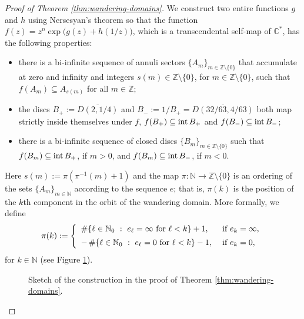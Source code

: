 \documentclass[a4paper, 12pt, reqno]{amsart}
\numberwithin{equation}{section}
\newcommand{\ds}{\displaystyle}
\theoremstyle{plain}
\theoremstyle{definition}
\theoremstyle{remark}
\newcommand{\C}{{\mathbb{C}}}
\newcommand{\Z}{{\mathbb{Z}}}
\newcommand{\N}{{\mathbb{N}}}
\begin{document}
\begin{proof}[Proof of Theorem \ref{thm:wandering-domains}] 
We construct two entire functions $g$ and $h$ using Nersesyan's theorem so that the function $f(z)=z^n\exp\bigl(g(z)+h(1/z)\bigr)$, which is a transcendental self-map of $\C^*$, has the following properties:
\begin{itemize}
\item there is a bi-infinite sequence of annuli sectors $\{A_m\}_{m\in\Z\setminus\{0\}}$ that accumulate at zero and infinity and integers $s(m)\in\Z\setminus\{0\}$, for $m\in\Z\setminus\{0\}$, such that $f(A_m)\subseteq A_{s(m)}$ for all $m\in\Z$;
\item the discs $B_+:=\overline{D(2,1/4)}$ and $B_-:=1/B_+=\overline{D(32/63, 4/63)}$ both map strictly inside themselves under $f$, $f(B_+)\subseteq \textup{int}\,B_+$ and $f(B_-)\subseteq \textup{int}\,B_-$;
\item there is a bi-infinite sequence of closed discs $\{B_m\}_{m\in\Z\setminus\{0\}}$ such that $f(B_m)\subseteq \textup{int}\,B_+$, if $m>0$, and $f(B_m)\subseteq \textup{int}\,B_-$, if $m<0$.
\end{itemize}
Here $s(m):=\pi(\pi^{-1}(m)+1)$ and the map $\pi:\N\longrightarrow \Z\setminus \{0\}$ is an ordering of the sets $\{A_m\}_{m\in\N}$ according to the sequence $e$; that is, $\pi(k)$ is the position of the $k$th component in the orbit of the wandering domain. More formally, we define
\begin{equation}
\pi(k):=\left\{
\begin{array}{ll}
\ds\#\{\ell\in\N_0\ :\ e_\ell=\infty \mbox{ for } \ell<k\}+1, & \mbox{ if } e_{k}=\infty,\vspace{5pt}\\
\ds-\,\#\{\ell\in\N_0\ :\ e_\ell=0 \mbox{ for } \ell<k\}-1, & \mbox{ if } e_{k}=0,
\end{array}
\right.
\label{eq:p-function}
\end{equation}
for $k\in\N$ (see Figure \ref{fig:sketch-wd}).

\begin{figure}[h!]
\centering
\vspace*{45pt}
\def\svgwidth{.8\linewidth}

\vspace*{30pt}
\caption[Sketch~of~the~construction~of~a~transcendental \mbox{self-map\,of\,$\C^*$\,with\,a\,wandering\,domain}]{Sketch of the construction in the proof of Theorem \ref{thm:wandering-domains}.}
\label{fig:sketch-wd}
\end{figure}


\end{proof}
\end{document}
